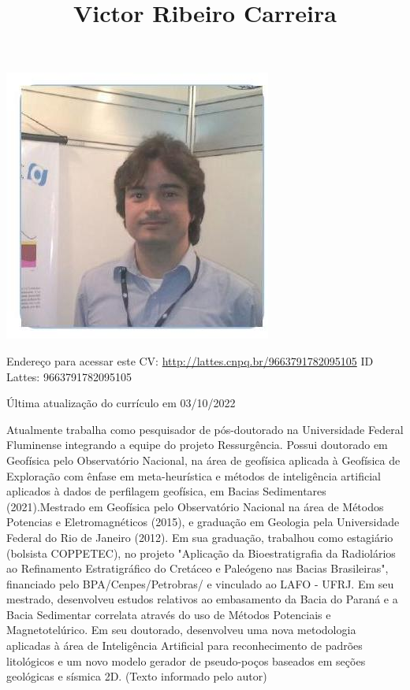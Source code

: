 \documentclass[10pt]{article}
\title{Victor Ribeiro Carreira }
\author{}
\date{}
\begin{document}
\maketitle
\begin{center}
\includegraphics[max width=\textwidth]{2024_06_29_acf33ffb82555b8284bcg-01}
\end{center}

Endereço para acessar este CV: \href{http://lattes.cnpq.br/9663791782095105}{http://lattes.cnpq.br/9663791782095105} ID Lattes: 9663791782095105

Última atualização do currículo em 03/10/2022

Atualmente trabalha como pesquisador de pós-doutorado na Universidade Federal Fluminense integrando a equipe do projeto Ressurgência. Possui doutorado em Geofísica pelo Observatório Nacional, na área de geofísica aplicada à Geofísica de Exploração com ênfase em meta-heurística e métodos de inteligência artificial aplicados à dados de perfilagem geofísica, em Bacias Sedimentares (2021).Mestrado em Geofísica pelo Observatório Nacional na área de Métodos Potencias e Eletromagnéticos (2015), e graduação em Geologia pela Universidade Federal do Rio de Janeiro (2012). Em sua graduação, trabalhou como estagiário (bolsista COPPETEC), no projeto "Aplicação da Bioestratigrafia da Radiolários ao Refinamento Estratigráfico do Cretáceo e Paleógeno nas Bacias Brasileiras", financiado pelo BPA/Cenpes/Petrobras/ e vinculado ao LAFO - UFRJ. Em seu mestrado, desenvolveu estudos relativos ao embasamento da Bacia do Paraná e a Bacia Sedimentar correlata através do uso de Métodos Potenciais e Magnetotelúrico. Em seu doutorado, desenvolveu uma nova metodologia aplicadas à área de Inteligência Artificial para reconhecimento de padrões litológicos e um novo modelo gerador de pseudo-poços baseados em seções geológicas e sísmica 2D. (Texto informado pelo autor)
\end{document}
